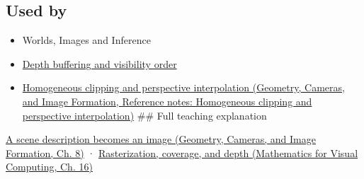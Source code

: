 \subsection{Used by}\label{appendix-ed3f9bc298fe-used-by}

\begin{itemize}
\item
  {Worlds, Images and Inference}
\item
  \hyperref[appendix-97578ed97952]{Depth buffering and visibility order}
\item
  \href{../03-Geometry-Cameras-and-Image-Formation/main.pdf\#nameddest=appendix-40426e4b2103}{Homogeneous clipping and perspective interpolation (Geometry, Cameras, and Image Formation, Reference notes: Homogeneous clipping and perspective interpolation)} \#\# Full teaching explanation
\end{itemize}

\href{../03-Geometry-Cameras-and-Image-Formation/main.pdf\#nameddest=03-visual-computing-i-ch001-a-scene-description-becomes-an-image}{A scene description becomes an image (Geometry, Cameras, and Image Formation, Ch. 8)} · \href{../02-Mathematics-for-Visual-Computing/main.pdf\#nameddest=03-visual-computing-i-ch012-rasterization-coverage-and-depth}{Rasterization, coverage, and depth (Mathematics for Visual Computing, Ch. 16)}
